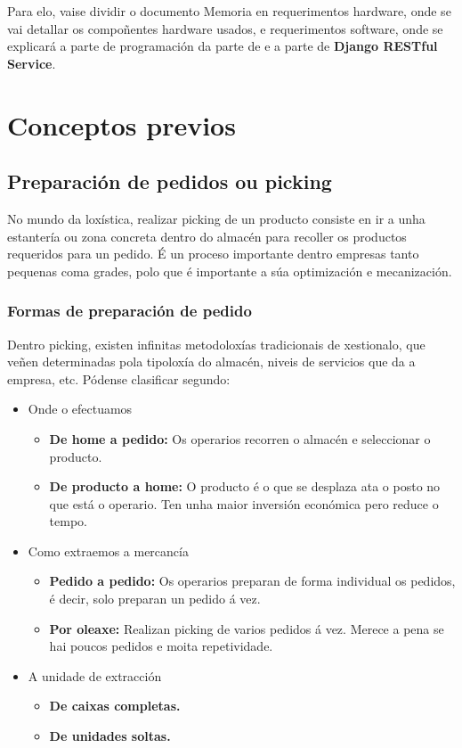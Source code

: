 \documentclass[11pt,twoside]{book}
\begin{document}
Para elo, vaise dividir o documento Memoria en requerimentos hardware, onde se vai detallar os compoñentes hardware usados, e requerimentos software, onde se explicará a parte de programación da parte de  e a parte de \textbf{Django RESTful Service}.

\chapter{Conceptos previos}

\section{Preparación de pedidos ou picking}

No mundo da loxística, realizar picking de un producto consiste en ir a unha estantería ou zona concreta dentro do almacén para recoller os productos requeridos para un pedido. É un proceso importante dentro empresas tanto pequenas coma grades, polo que é importante a súa optimización e mecanización.

\subsection{Formas de preparación de pedido}
Dentro picking, existen infinitas metodoloxías tradicionais de xestionalo, que veñen determinadas pola tipoloxía do almacén, niveis de servicios que da a empresa, etc. 
Pódense clasificar segundo:

\begin{itemize}
    \item Onde o efectuamos
        \begin{itemize}
            \item \textbf{De home a pedido:} Os operarios recorren o almacén e seleccionar o producto. 
            \item \textbf{De producto a home:} O producto é o que se desplaza ata o posto no que está o operario. Ten unha maior inversión económica pero reduce o tempo.
        \end{itemize}
    \item Como extraemos a mercancía
        \begin{itemize}
            \item \textbf{Pedido a pedido: } Os operarios preparan de forma individual os pedidos, é decir, solo preparan un pedido á vez. 
            \item \textbf{Por oleaxe: } Realizan picking de varios pedidos á vez. Merece a pena se hai poucos pedidos e moita repetividade. 
        \end{itemize}
    \item A unidade de extracción
        \begin{itemize}
            \item \textbf{De caixas completas.}
            \item \textbf{De unidades soltas.}
        \end{itemize}
\end{itemize}
\end{document}
